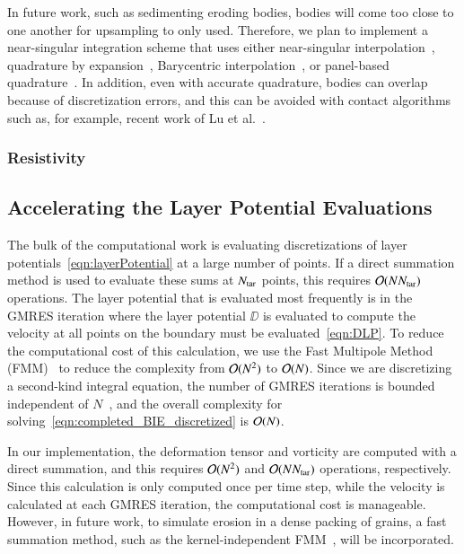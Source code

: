 \documentclass[preprint, 10pt]{elsarticle}
\begin{document}
In future work, such as sedimenting eroding bodies, bodies will come too
close to one another for upsampling to only used.  Therefore, we plan to
implement a near-singular integration scheme that uses either
near-singular interpolation~\cite{qua-bir2014a}, quadrature by
expansion~\cite{klo-bar-gre-one2013}, Barycentric
interpolation~\cite{bar-wu-vee2015}, or panel-based
quadrature~\cite{hel-oja2008a}.  In addition, even with accurate
quadrature, bodies can overlap because of discretization errors, and
this can be avoided with contact algorithms such as, for example, recent
work of Lu et al.~\cite{lu-rah-zor2017}.







\subsubsection{Resistivity}



\subsection{Accelerating the Layer Potential Evaluations}
\label{sec:fmm}
The bulk of the computational work is evaluating discretizations of
layer potentials~\eqref{eqn:layerPotential} at a large number of points.
If a direct summation method is used to evaluate these sums at $N_{\mathrm{tar}}$
points, this requires ${\mathcal{O}}(NN_{\mathrm{tar}})$ operations.  The layer potential
that is evaluated most frequently is in the GMRES iteration where the
layer potential $\DD$ is evaluated to compute the velocity at all points
on the boundary must be evaluated~\eqref{eqn:DLP}.  To reduce the
computational cost of this calculation, we use the Fast Multipole Method
(FMM)~\cite{gre-rok1987, gre-gre-may1992} to reduce the complexity from
${\mathcal{O}}(N^2)$ to ${\mathcal{O}}(N)$.  Since we are discretizing a second-kind
integral equation, the number of GMRES iterations is bounded independent
of $N$~\cite{cam-ips-kel-mey-xue1996}, and the overall complexity for
solving~\eqref{eqn:completed_BIE_discretized} is ${\mathcal{O}}(N)$.

In our implementation, the deformation tensor and vorticity are computed
with a direct summation, and this requires ${\mathcal{O}}(N^2)$ and ${\mathcal{O}}(N
N_{\mathrm{tar}})$ operations, respectively.  Since this calculation is only
computed once per time step, while the velocity is calculated at each
GMRES iteration, the computational cost is manageable.  However, in
future work, to simulate erosion in a dense packing of grains, a fast
summation method, such as the kernel-independent
FMM~\cite{yin-bir-zor2004}, will be incorporated. 
\end{document}
